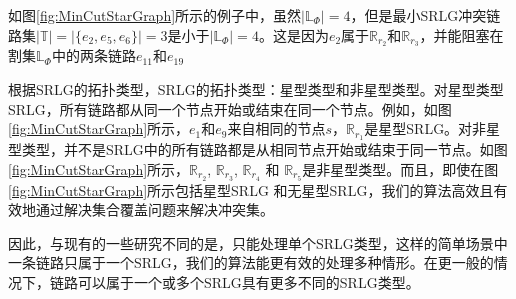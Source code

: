 如图\ref{fig:MinCutStarGraph}所示的例子中，虽然$|\mathbb{L}_{\Phi}|=4$，但是最小SRLG冲突链路集$|\mathbb{T}|=|\{e_2, e_5, e_6 \}|=3$是小于$|\mathbb{L}_{\Phi}|=4$。这是因为$e_2$属于$\mathbb{R}_{r_2}$和$\mathbb{R}_{r_3}$，并能阻塞在割集$\mathbb{L}_{\Phi}$中的两条链路$e_{11}$和$e_{19}$ 


根据SRLG的拓扑类型\cite{datta2008graph}，SRLG的拓扑类型：星型类型和非星型类型。对星型类型SRLG，所有链路都从同一个节点开始或结束在同一个节点。例如，如图\ref{fig:MinCutStarGraph}所示，$e_1$和$e_9$来自相同的节点$s$，$\mathbb{R}_{r_1}$是星型SRLG。对非星型类型，并不是SRLG中的所有链路都是从相同节点开始或结束于同一节点。如图\ref{fig:MinCutStarGraph}所示，$\mathbb{R}_{r_2}$, $\mathbb{R}_{r_3}$, $\mathbb{R}_{r_4}$ 和 $\mathbb{R}_{r_5}$是非星型类型。而且，即使在图\ref{fig:MinCutStarGraph}所示包括星型SRLG 和无星型SRLG，我们的算法高效且有效地通过解决集合覆盖问题来解决冲突集。


因此，与现有的一些研究不同的是，\cite{datta2008graph}只能处理单个SRLG类型，这样的简单场景中一条链路只属于一个SRLG，我们的算法能更有效的处理多种情形。在更一般的情况下，链路可以属于一个或多个SRLG具有更多不同的SRLG类型。
